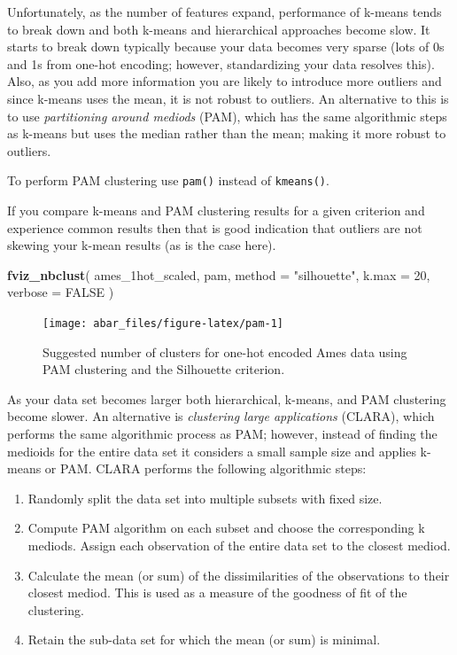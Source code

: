 \documentclass[]{book}
\newenvironment{Shaded}{\begin{snugshade}}{\end{snugshade}}
\newcommand{\DataTypeTok}[1]{\textcolor[rgb]{0.13,0.29,0.53}{#1}}
\newcommand{\DecValTok}[1]{\textcolor[rgb]{0.00,0.00,0.81}{#1}}
\newcommand{\KeywordTok}[1]{\textcolor[rgb]{0.13,0.29,0.53}{\textbf{#1}}}
\newcommand{\NormalTok}[1]{#1}
\newcommand{\OtherTok}[1]{\textcolor[rgb]{0.56,0.35,0.01}{#1}}
\newcommand{\StringTok}[1]{\textcolor[rgb]{0.31,0.60,0.02}{#1}}
\providecommand{\tightlist}{%
  \setlength{\itemsep}{0pt}\setlength{\parskip}{0pt}}
\theoremstyle{definition}
\theoremstyle{definition}
\theoremstyle{definition}
\theoremstyle{remark}
\let\BeginKnitrBlock\begin \let\EndKnitrBlock\end
\begin{document}
Unfortunately, as the number of features expand, performance of k-means
tends to break down and both k-means and hierarchical approaches become
slow. It starts to break down typically because your data becomes very
sparse (lots of 0s and 1s from one-hot encoding; however, standardizing
your data resolves this). Also, as you add more information you are
likely to introduce more outliers and since k-means uses the mean, it is
not robust to outliers. An alternative to this is to use
\emph{partitioning around mediods} (PAM), which has the same algorithmic
steps as k-means but uses the median rather than the mean; making it
more robust to outliers.

\BeginKnitrBlock{tip}
To perform PAM clustering use \texttt{pam()} instead of
\texttt{kmeans()}.
\EndKnitrBlock{tip}

If you compare k-means and PAM clustering results for a given criterion
and experience common results then that is good indication that outliers
are not skewing your k-mean results (as is the case here).

\begin{Shaded}
\begin{Highlighting}[]
\KeywordTok{fviz_nbclust}\NormalTok{(}
\NormalTok{  ames_1hot_scaled, }
\NormalTok{  pam, }
  \DataTypeTok{method =} \StringTok{"silhouette"}\NormalTok{, }
  \DataTypeTok{k.max =} \DecValTok{20}\NormalTok{, }
  \DataTypeTok{verbose =} \OtherTok{FALSE}
\NormalTok{  )}
\end{Highlighting}
\end{Shaded}

\begin{figure}

{\centering \texttt{[image: abar\_files/figure-latex/pam-1]} 

}

\caption{Suggested number of clusters for one-hot encoded Ames data using PAM clustering and the Silhouette criterion.}\label{fig:pam}
\end{figure}

As your data set becomes larger both hierarchical, k-means, and PAM
clustering become slower. An alternative is \emph{clustering large
applications} (CLARA), which performs the same algorithmic process as
PAM; however, instead of finding the medioids for the entire data set it
considers a small sample size and applies k-means or PAM. CLARA performs
the following algorithmic steps:

\begin{enumerate}
\def\labelenumi{\arabic{enumi}.}
\tightlist
\item
  Randomly split the data set into multiple subsets with fixed size.
\item
  Compute PAM algorithm on each subset and choose the corresponding k
  mediods. Assign each observation of the entire data set to the closest
  mediod.
\item
  Calculate the mean (or sum) of the dissimilarities of the observations
  to their closest mediod. This is used as a measure of the goodness of
  fit of the clustering.
\item
  Retain the sub-data set for which the mean (or sum) is minimal.
\end{enumerate}
\end{document}
